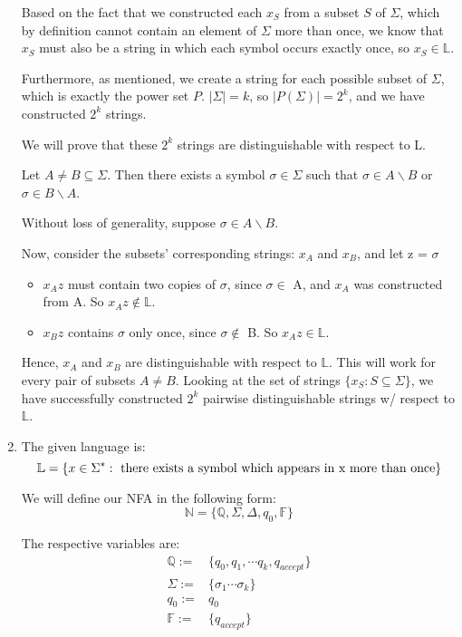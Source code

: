 \documentclass[12pt]{article}
\begin{document}
\begin{enumerate}[\bf P1.]
Based on the fact that we constructed each $x_S$ from a subset $S$ of $\Sigma$, which by definition cannot contain an element of $\Sigma$ more than once, we know that $x_S$ must also be a string in which each symbol occurs exactly once, so $x_S \in \mathbb{L}$.

Furthermore, as mentioned, we create a string for each possible subset of $\Sigma$, which is exactly the power set $P$. $|\Sigma| = k$, so $|P(\Sigma)| = 2^k$, and we have constructed $2^k$ strings.

We will prove that these $2^k$ strings are distinguishable with respect to L.

Let $A \neq B \subseteq \Sigma$. Then there exists a symbol $\sigma \in \Sigma$ such that $\sigma \in A \backslash B$ or $\sigma \in B \backslash A$.

Without loss of generality, suppose $\sigma \in A \backslash B$.

Now, consider the subsets' corresponding strings: $x_A$ and $x_B$, and let z = $\sigma$

\begin{itemize}
    \item $x_A z$ must contain two copies of $\sigma$, since $\sigma \in$ A, and $x_A$ was constructed from A. So $x_A z \notin \mathbb{L}$.
    \item $x_B z$ contains $\sigma$ only once, since $\sigma \notin$ B. So $x_A z \in \mathbb{L}$.
\end{itemize}

Hence, $x_A$ and $x_B$ are distinguishable with respect to $\mathbb{L}$. This will work for every pair of subsets $A \neq B$. Looking at the set of strings $\{x_S : S \subseteq \Sigma\}$, we have successfully constructed $2^k$ pairwise distinguishable strings w/ respect to $\mathbb{L}$.

\newpage
\item
The given language is:
\[
\mathbb{L} = \{x \in \Sigma^* : \text{ there exists a symbol which appears in x more than once}\} \\
\]

We will define our NFA in the following form:
\[
\mathbb{N} = \{\mathbb{Q}, \Sigma, \Delta, q_0, \mathbb{F}\}
\]

The respective variables are:
\[
\begin{aligned}
\mathbb{Q} :=& \{ q_0, q_1, \cdots q_k, q_{accept}\} \\
\Sigma :=& \{\sigma_1 \cdots \sigma_k\} \\
q_0 :=& q_0 \\
\mathbb{F} :=& \{q_{accept}\} \\
\end{aligned}
\]


\end{enumerate}
\end{document}
